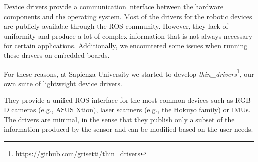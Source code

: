 Device drivers provide a communication interface between the hardware
components and the operating system. Most of the drivers for the
robotic devices are publicly available through the ROS
community. However, they lack of uniformity and produce a lot of
complex information that is not always necessary for certain
applications. Additionally, we encountered some issues when running
these drivers on embedded boards.

For these reasons, at Sapienza University we started to develop
\textit{thin\_drivers}\footnote{https://github.com/grisetti/thin\_drivers},
our own suite of lightweight device drivers.

They provide a unified ROS interface for the most common devices such
as RGB-D cameras (e.g., ASUS Xtion), laser scanners (e.g., the Hokuyo
family) or IMUs. The drivers are minimal, in the sense that they
publish only a subset of the information produced by the sensor and
can be modified based on the user needs.






